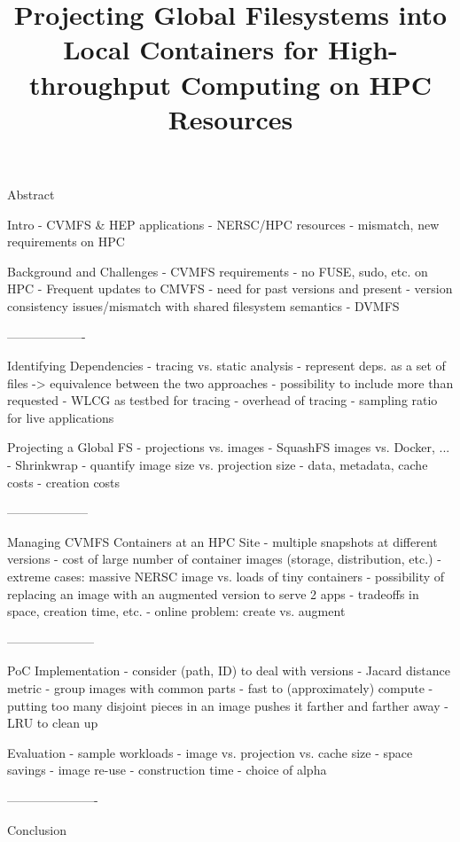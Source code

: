 \documentclass[conference]{IEEEtran}
\begin{document}
\title{Projecting Global Filesystems into Local Containers for High-throughput Computing on HPC Resources}


Abstract

Intro
- CVMFS & HEP applications
- NERSC/HPC resources
- mismatch, new requirements on HPC

Background and Challenges
- CVMFS requirements
- no FUSE, sudo, etc. on HPC
- Frequent updates to CMVFS
- need for past versions and present
- version consistency issues/mismatch with shared filesystem semantics
- DVMFS

-------------------

Identifying Dependencies
- tracing vs. static analysis
- represent deps. as a set of files -> equivalence between the two approaches
- possibility to include more than requested
- WLCG as testbed for tracing
- overhead of tracing
- sampling ratio for live applications

Projecting a Global FS
- projections vs. images
- SquashFS images vs. Docker, ...
- Shrinkwrap
- quantify image size vs. projection size
- data, metadata, cache costs
- creation costs

--------------------

Managing CVMFS Containers at an HPC Site
- multiple snapshots at different versions
- cost of large number of container images (storage, distribution, etc.)
- extreme cases: massive NERSC image vs. loads of tiny containers
- possibility of replacing an image with an augmented version to serve 2 apps
- tradeoffs in space, creation time, etc.
- online problem: create vs. augment

---------------------

PoC Implementation
- consider (path, ID) to deal with versions
- Jacard distance metric
- group images with common parts
- fast to (approximately) compute
- putting too many disjoint pieces in an image pushes it farther and farther away
- LRU to clean up

Evaluation
- sample workloads
- image vs. projection vs. cache size
- space savings
- image re-use
- construction time
- choice of alpha

----------------------

Conclusion

\fi

\author{
\and
{}
\and
{}
\IEEEauthorblockN{\&}
\and
{}
}
\end{document}
